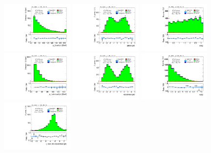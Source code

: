 \clearpage
\begin{figure}[tp]
  \includegraphics[width=0.32\textwidth]{figures/analysis/vbf-QCDCR/jet-1-pt}
  \includegraphics[width=0.32\textwidth]{figures/analysis/vbf-QCDCR/jet-1-eta}
  \includegraphics[width=0.32\textwidth]{figures/analysis/vbf-QCDCR/jets-dphi}
  \includegraphics[width=0.32\textwidth]{figures/analysis/vbf-QCDCR/jet-2-pt}
  \includegraphics[width=0.32\textwidth]{figures/analysis/vbf-QCDCR/jet-2-eta}
  \includegraphics[width=0.32\textwidth]{figures/analysis/vbf-QCDCR/jets-deta}
  \includegraphics[width=0.32\textwidth]{figures/analysis/vbf-QCDCR/jets-etaprod}

\end{figure}
